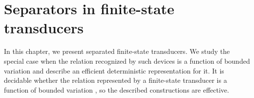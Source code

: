 \chapter{Separators in finite-state transducers}
\label{chapter:separators_finite_state_transducers}

In this chapter, we present separated finite-state transducers. We study the special
case when the relation recognized by such devices is a function of bounded variation
and describe an efficient deterministic representation for it. It is decidable
whether the relation represented by a finite-state transducer is a function of
bounded variation \cite{beal}, so the described constructions are effective.



\pagebreak


